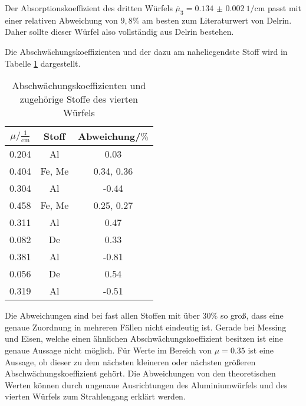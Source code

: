 Der Absorptionskoeffizient des dritten Würfels $\bar\mu_3 = \SI{0.134(2)}{1\per\centi\meter}$
passt mit einer relativen Abweichung von $9,8$\% am besten zum Literaturwert von
Delrin. Daher sollte dieser Würfel also vollständig aus Delrin bestehen.



Die Abschwächungskoeffizienten und der dazu am naheliegendste Stoff wird in
Tabelle \ref{tab:abw} dargestellt.

\begin{table}[H]
  \centering
  \caption{Abschwächungskoeffizienten und zugehörige Stoffe des vierten Würfels}
  \label{tab:abw}
  \begin{tabular}{c c c}
    \toprule
    $\mu/ \mathrm{\frac{1}{cm}}$ & Stoff & Abweichung/$\%$   \\
    \midrule
    0.204      &  Al     &   0.03    \\
    0.404      &  Fe, Me &   0.34, 0.36    \\
    0.304      &  Al     &  -0.44    \\
    0.458      &  Fe, Me &   0.25, 0.27    \\
    0.311      &  Al     &   0.47    \\
    0.082      &  De     &   0.33    \\
    0.381      &  Al     &  -0.81    \\
    0.056      &  De     &   0.54   \\
    0.319      &  Al     &  -0.51  \\
    \bottomrule
  \end{tabular}
\end{table}

Die Abweichungen sind bei fast allen Stoffen mit über $30\%$ so groß, dass
eine genaue Zuordnung in mehreren Fällen nicht eindeutig ist. Gerade bei Messing und
Eisen, welche einen ähnlichen Abschwächungskoeffizient besitzen ist eine genaue
Aussage nicht möglich. Für Werte im Bereich von $\mu = 0.35$ ist eine Aussage, ob
dieser zu dem nächsten kleineren oder nächsten größeren Abschwächungskoeffizient
gehört. Die Abweichungen von den theoretischen Werten können durch ungenaue Ausrichtungen des
Aluminiumwürfels und des vierten Würfels zum Strahlengang erklärt werden.
